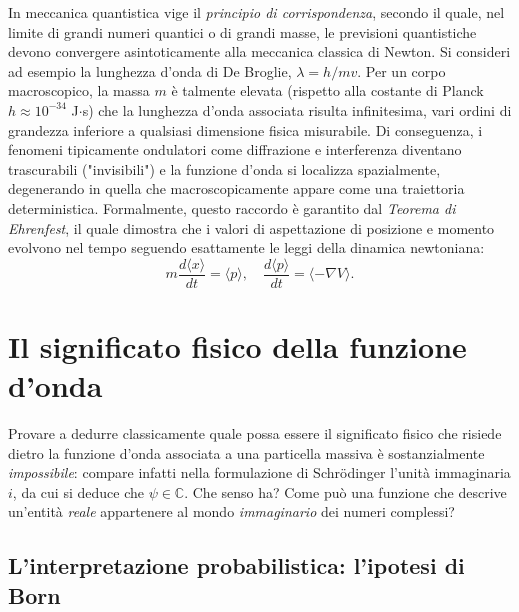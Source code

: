 \documentclass[a4paper,11pt]{report}
\begin{document}
\noindent
In meccanica quantistica vige il \textit{principio di corrispondenza}, secondo il quale, nel limite di grandi numeri quantici o di grandi masse, le previsioni quantistiche devono convergere asintoticamente alla meccanica classica di Newton.
Si consideri ad esempio la lunghezza d'onda di De Broglie, $\lambda = h/mv$. Per un corpo macroscopico, la massa $m$ è talmente elevata (rispetto alla costante di Planck $h \approx 10^{-34}$ J$\cdot$s) che la lunghezza d'onda associata risulta infinitesima, vari ordini di grandezza inferiore a qualsiasi dimensione fisica misurabile.
Di conseguenza, i fenomeni tipicamente ondulatori come diffrazione e interferenza diventano trascurabili ("invisibili") e la funzione d'onda si localizza spazialmente, degenerando in quella che macroscopicamente appare come una traiettoria deterministica. Formalmente, questo raccordo è garantito dal \textit{Teorema di Ehrenfest}, il quale dimostra che i valori di aspettazione di posizione e momento evolvono nel tempo seguendo esattamente le leggi della dinamica newtoniana:
\begin{equation}
    m \frac{d\langle x \rangle}{dt} = \langle p \rangle, \quad \frac{d\langle p \rangle}{dt} = \langle -\nabla V \rangle.
\end{equation}
 

\section{Il significato fisico della funzione d'onda}
Provare a dedurre classicamente quale possa essere il significato fisico che risiede dietro la funzione d'onda associata a una particella massiva è sostanzialmente \textit{impossibile}: compare infatti nella formulazione di Schrödinger l'unità immaginaria $i$, da cui si deduce che $\psi \in \mathbb{C}$. Che senso ha? Come può una funzione che descrive un'entità \textit{reale} appartenere al mondo \textit{immaginario} dei numeri complessi?

\subsection{L'interpretazione probabilistica: l'ipotesi di Born}
\end{document}
